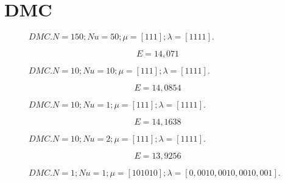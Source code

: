 

\section{DMC}

\begin{figure}[H]
    \centering
    
    \caption{$DMC. N = 150; Nu = 50; \mu = [1 1 1]; \lambda = [1 1 1 1].$}
\end{figure}

\begin{equation}
    E = 14,071
\end{equation}


\begin{figure}[H]
    \centering
    
    \caption{$DMC. N = 10; Nu = 10; \mu = [1 1 1]; \lambda = [1 1 1 1].$}
\end{figure}

\begin{equation}
    E = 14,0854
\end{equation}


\begin{figure}[H]
    \centering
    
    \caption{$DMC. N = 10; Nu = 1; \mu = [1 1 1]; \lambda = [1 1 1 1].$}
\end{figure}

\begin{equation}
    E = 14,1638
\end{equation}


\begin{figure}[H]
    \centering
    
    \caption{$DMC. N = 10; Nu = 2; \mu = [1 1 1]; \lambda = [1 1 1 1].$}
\end{figure}

\begin{equation}
    E = 13,9256
\end{equation}
    


\begin{figure}[H]
    \centering
    
    \caption{$DMC. N = 1; Nu = 1; \mu = [10 10 10]; \lambda = [0,001 0,001 0,001 0,001].$}
\end{figure}


